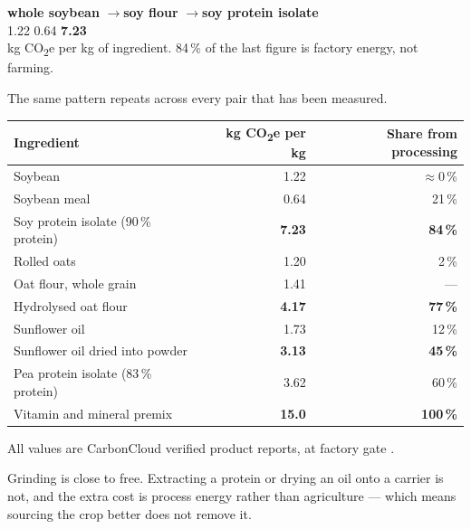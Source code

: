 \documentclass[11pt,a4paper]{article}
\newcommand{\co}{CO\textsubscript{2}e}
\begin{document}
\begin{center}
\begin{tcolorbox}[colback=tint,colframe=rule,boxrule=0.6pt,arc=2pt,left=10pt,right=10pt,top=8pt,bottom=8pt,width=0.9\textwidth]
\centering
\small
\textbf{whole soybean} \quad$\longrightarrow$\quad \textbf{soy flour} \quad$\longrightarrow$\quad \textbf{soy protein isolate}\\[0.4em]
1.22 \hspace{5.0em} 0.64 \hspace{6.4em} \textbf{7.23}\\[0.5em]
\footnotesize kg \co{} per kg of ingredient. 84\,\% of the last figure is factory energy, not farming.
\end{tcolorbox}
\end{center}

The same pattern repeats across every pair that has been measured.

\begin{table}[h]
\centering
\footnotesize
\begin{tabular}{@{}lrr@{}}
\toprule
\textbf{Ingredient} & \textbf{kg \co{} per kg} & \textbf{Share from processing} \\
\midrule
Soybean & 1.22 & $\approx$0\,\% \\
Soybean meal & 0.64 & 21\,\% \\
Soy protein isolate (90\,\% protein) & \textbf{7.23} & \textbf{84\,\%} \\
\addlinespace
Rolled oats & 1.20 & 2\,\% \\
Oat flour, whole grain & 1.41 & --- \\
Hydrolysed oat flour & \textbf{4.17} & \textbf{77\,\%} \\
\addlinespace
Sunflower oil & 1.73 & 12\,\% \\
Sunflower oil dried into powder & \textbf{3.13} & \textbf{45\,\%} \\
\addlinespace
Pea protein isolate (83\,\% protein) & 3.62 & 60\,\% \\
Vitamin and mineral premix & \textbf{15.0} & \textbf{100\,\%} \\
\bottomrule
\end{tabular}
\end{table}

\noindent All values are CarbonCloud verified product reports, at factory gate
\cite{cc-spi,cc-oat,cc-sun,cc-pea,cc-premix}.

Grinding is close to free. Extracting a protein or drying an oil onto a carrier is
not, and the extra cost is process energy rather than agriculture — which means
sourcing the crop better does not remove it.
\end{document}
